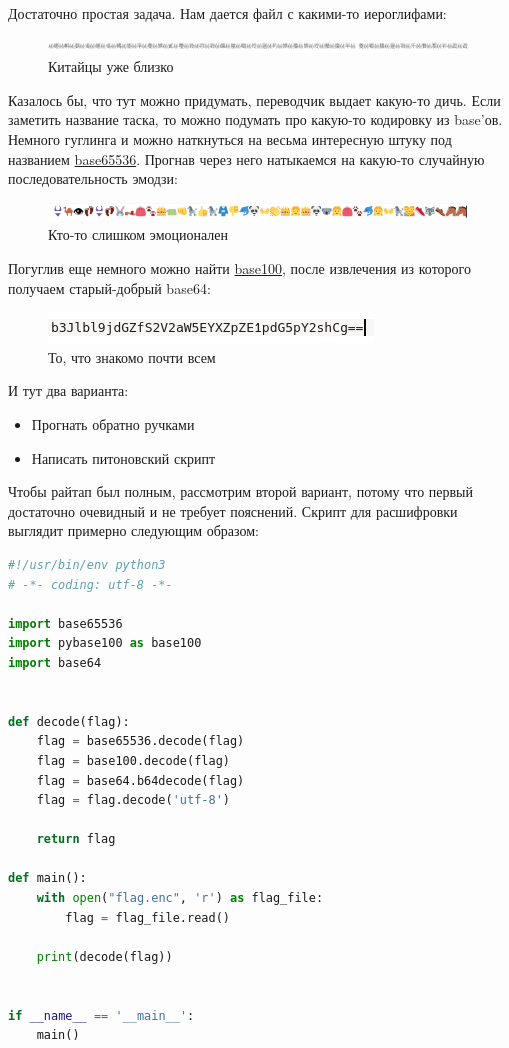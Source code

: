 \documentclass[idxtotoc,hyperref,openany,oneside]{files/crypto} %
\begin{document}
Достаточно простая задача. Нам дается файл с какими-то иероглифами:
\begin{figure}[H]
\begin{center}
\includegraphics[width=1.0\linewidth]{files/chinese}
\end{center}
\caption{Китайцы уже близко}
\label{fig:chinese}
\end{figure}
Казалось бы, что тут можно придумать, переводчик выдает какую-то дичь. Если заметить название таска, то можно подумать про какую-то кодировку из base'ов. Немного гуглинга и можно наткнуться на весьма интересную штуку под названием \href{https://github.com/qntm/base65536}{base65536}. Прогнав через него натыкаемся на какую-то случайную последовательность эмодзи:
\begin{figure}[H]
\begin{center}
\includegraphics[width=1.0\linewidth]{files/emoji}
\end{center}
\caption{Кто-то слишком эмоционален}
\label{fig:emoji}
\end{figure}
Погуглив еще немного можно найти \href{https://github.com/AdamNiederer/base100}{base100}, после извлечения из которого получаем старый-добрый base64:
\begin{figure}[H]
\begin{center}
\includegraphics[width=0.7\linewidth]{files/base64}
\end{center}
\caption{То, что знакомо почти всем}
\label{fig:base64}
\end{figure}
И тут два варианта:
\begin{itemize}
\item Прогнать обратно ручками
\item Написать питоновский скрипт
\end{itemize}
Чтобы райтап был полным, рассмотрим второй вариант, потому что первый достаточно очевидный и не требует пояснений. Скрипт для расшифровки выглядит примерно следующим образом:
\begin{lstlisting}[language=Python, caption=Дешифровка флага]
#!/usr/bin/env python3
# -*- coding: utf-8 -*-

import base65536
import pybase100 as base100
import base64


def decode(flag):
    flag = base65536.decode(flag)
    flag = base100.decode(flag)
    flag = base64.b64decode(flag)
    flag = flag.decode('utf-8')

    return flag

def main():
    with open("flag.enc", 'r') as flag_file:
        flag = flag_file.read()

    print(decode(flag))


if __name__ == '__main__':
    main()
\end{lstlisting}
\end{document}
